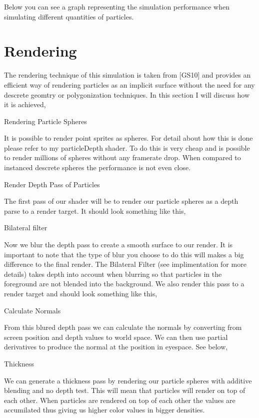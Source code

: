 Below you can see a graph representing the simulation performance when simulating different quantities of particles. 

\section*{Rendering }

The rendering technique of this simulation is taken from \mbox{[}G\-S10\mbox{]} and provides an efficient way of rendering particles as an implicit surface without the need for any descrete geomtry or polygonization techniques. In this section I will discuss how it is achieved,


\begin{DoxyEnumerate}
\item Rendering Particle Spheres\par
 It is possible to render point sprites as spheres. For detail about how this is done please refer to my particle\-Depth shader. To do this is very cheap and is possible to render millions of spheres without any framerate drop. When compared to instanced descrete spheres the performance is not even close.
\item Render Depth Pass of Particles\par
 The first pass of our shader will be to render our particle spheres as a depth parse to a render target. It should look something like this,\par
 
\item Bilateral filter\par
 Now we blur the depth pass to create a smooth surface to our render. It is important to note that the type of blur you choose to do this will makes a big difference to the final render. The Bilateral Filter (see implimentation for more details) takes depth into account when blurring so that particles in the foreground are not blended into the background. We also render this pass to a render target and should look something like this,\par
 
\item Calculate Normals\par
 From this blured depth pass we can calculate the normals by converting from screen position and depth values to world space. We can then use partial derivatives to produce the normal at the position in eyespace. See below,\par
 
\item Thickness\par
 We can generate a thickness pass by rendering our particle spheres with additive blending and no depth test. This will mean that particles will render on top of each other. When particles are rendered on top of each other the values are accumilated thus giving us higher color values in bigger densities.\par
 

\end{DoxyEnumerate}
